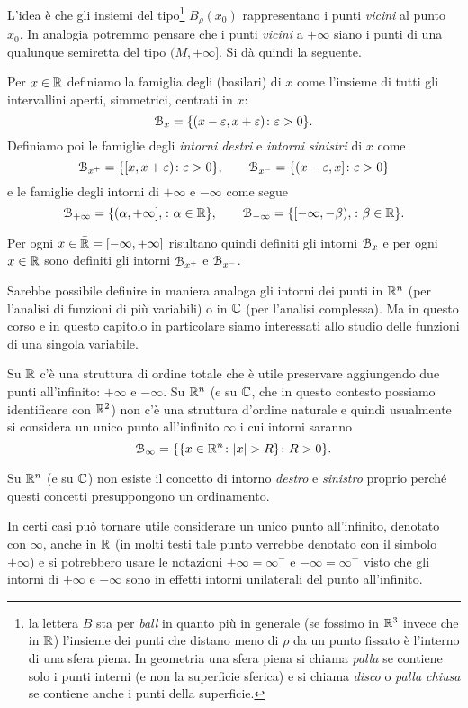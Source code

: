 L'idea è che gli insiemi del tipo\footnote{%
la lettera $B$ sta per \emph{ball} in quanto 
più in generale (se fossimo in $\mathbb R^3$ invece che in $\mathbb R$)
l'insieme dei punti che distano meno di $\rho$ da un punto fissato 
è l'interno di una sfera piena. 
In geometria una sfera piena si chiama \emph{palla} 
se contiene solo i punti interni (e non la superficie sferica)
e si chiama \emph{disco} o \emph{palla chiusa} se contiene 
anche i punti della superficie.
}%
$B_\rho(x_0)$ 
rappresentano i punti \emph{vicini} al punto $x_0$. 
In analogia potremmo pensare che i punti \emph{vicini} 
a $+\infty$ siano i punti di una qualunque semiretta 
del tipo $(M,+\infty]$.
Si dà quindi la seguente.


\begin{definition}[intorno]
Per $x\in \mathbb R$ definiamo la famiglia degli  (basilari) di $x$
come l'insieme di tutti gli intervallini aperti, simmetrici, centrati in $x$:
\[
  \mathcal B_x = {\left\{  (x-\varepsilon, x+\varepsilon) \colon \varepsilon>0 \right\}}.
\]
Definiamo poi le famiglie 
degli \emph{intorni destri} e \emph{intorni sinistri}
di $x$ come
\[
  \mathcal B_{x^+} = {\left\{  [x, x+\varepsilon) \colon \varepsilon>0 \right\}},
  \qquad
  \mathcal B_{x^-} = {\left\{  (x-\varepsilon , x] \colon \varepsilon>0 \right\}}
\]
e le famiglie degli intorni di $+\infty$ e $-\infty$ come segue
\[
  \mathcal B_{+\infty} = {\left\{  (\alpha,+\infty], \colon \alpha \in \mathbb R  \right\}},\qquad
  \mathcal B_{-\infty} = {\left\{  [-\infty, -\beta), \colon \beta\in \mathbb R \right\}}.
\]

Per ogni $x\in \bar {\mathbb R} = [-\infty, +\infty]$
risultano quindi definiti gli intorni $\mathcal B_x$ e per
ogni $x\in \mathbb R$ sono definiti gli intorni $\mathcal B_{x^+}$ e $\mathcal B_{x^-}$.
\end{definition}

\begin{remark}
Sarebbe possibile definire in maniera analoga gli intorni dei punti in $\mathbb R^n$
(per l'analisi di funzioni di più variabili)
o in $\mathbb C$ (per l'analisi complessa).
Ma in questo corso e in questo capitolo in particolare siamo interessati 
allo studio delle funzioni di una singola variabile.

Su $\mathbb R$ c'è una struttura di ordine totale che è utile preservare aggiungendo
due punti all'infinito: $+\infty$ e $-\infty$.
Su $\mathbb R^n$ (e su $\mathbb C$, che in questo contesto possiamo identificare con $\mathbb R^2$)
non c'è una struttura d'ordine naturale e quindi
usualmente si considera un unico punto all'infinito $\infty$ i cui intorni
saranno
\[
  \mathcal B_\infty = {\left\{ {\left\{ x \in \mathbb R^n\colon {\left|x\right|}>R \right\}}\colon R>0 \right\}}.
\]

Su $\mathbb R^n$ (e su $\mathbb C$) non esiste il concetto di intorno \emph{destro}
e \emph{sinistro} proprio perché questi concetti presuppongono un ordinamento.

In certi casi può tornare utile considerare un unico punto all'infinito,
denotato con $\infty$, anche in $\mathbb R$ (in molti testi tale punto verrebbe
denotato con il simbolo $\pm\infty$)
e si potrebbero usare le notazioni $+\infty = \infty^-$ e $-\infty = \infty^
+$ visto che gli intorni di $+\infty$ e $-\infty$ sono in effetti intorni
unilaterali del punto all'infinito.
\end{remark}

